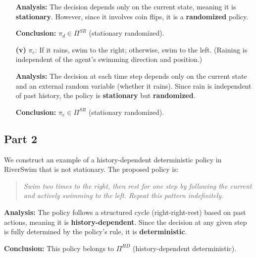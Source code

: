 \begin{enumerate}
    \textbf{Analysis:} The decision depends only on the current state, meaning it is \textbf{stationary}. However, since it involves coin flips, it is a \textbf{randomized} policy.

    \textbf{Conclusion:} \(\pi_d \in \Pi^{SR}\) (stationary randomized).

    \item[\textbf{(v)}] \(\pi_e\): If it rains, swim to the right; otherwise, swim to the left. (Raining is independent of the agent’s swimming direction and position.)

    \textbf{Analysis:} The decision at each time step depends only on the current state and an external random variable (whether it rains). Since rain is independent of past history, the policy is \textbf{stationary} but \textbf{randomized}.

    \textbf{Conclusion:} \(\pi_e \in \Pi^{SR}\) (stationary randomized).

\end{enumerate}

\subsection*{Part 2}

We construct an example of a history-dependent deterministic policy in RiverSwim that is not stationary. The proposed policy is:

\begin{quote}
\textit{Swim two times to the right, then rest for one step by following the current and actively swimming to the left. Repeat this pattern indefinitely.}
\end{quote}

\textbf{Analysis:} The policy follows a structured cycle (right-right-rest) based on past actions, meaning it is \textbf{history-dependent}. Since the decision at any given step is fully determined by the policy’s rule, it is \textbf{deterministic}.

\textbf{Conclusion:} This policy belongs to \(\Pi^{HD}\) (history-dependent deterministic).